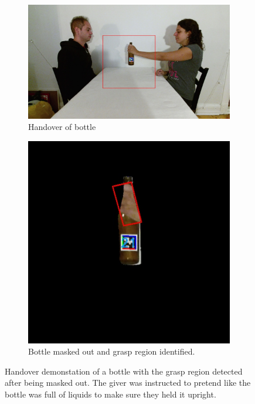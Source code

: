 \begin{figure}
	\centering
	\begin{subfigure}[t]{\textwidth}
		\centering
		\includegraphics[width=\textwidth]{img/methods/handovers/bottle_frame.jpg}
		\caption{Handover of bottle}
		\label{fig:demo_handover_bottle}
	\end{subfigure}
	\par\bigskip
	\begin{subfigure}[t]{0.5\textwidth}
		\centering
		\includegraphics[width=\textwidth]{img/methods/handovers/bottle_masked.jpg}
		\caption{Bottle masked out and grasp region identified.}
		\label{fig:handover_bottle_masked}
	\end{subfigure}
	\caption{Handover demonstation of a bottle with the grasp region detected after being masked out. The giver was instructed to pretend like the bottle was full of liquids to make sure they held it upright.}
	\label{fig:handover_bottle}
\end{figure}

